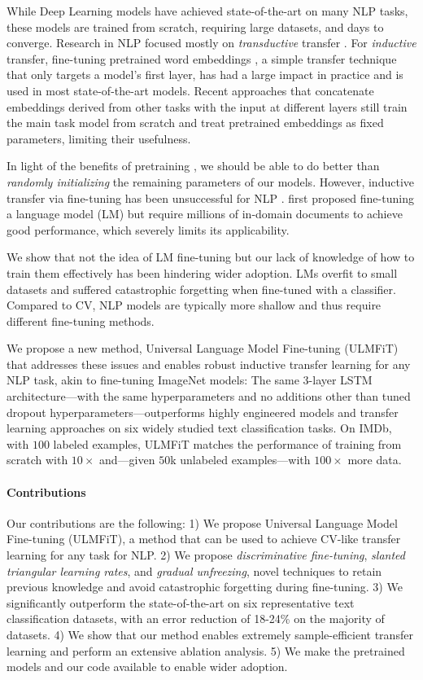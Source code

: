 \documentclass[11pt,a4paper]{article}
\begin{document}
While Deep Learning models have achieved state-of-the-art on many NLP tasks, these models are trained from scratch, requiring large datasets, and days to converge. Research in NLP focused mostly on \emph{transductive} transfer \cite{Blitzer2007}. For \emph{inductive} transfer, fine-tuning pretrained word embeddings \cite{Mikolov2013d}, a simple transfer technique that only targets a model's first layer, has had a large impact in practice and is used in most state-of-the-art models. Recent approaches that concatenate embeddings derived from other tasks with the input at different layers \cite{peters2017semi,Mccann2017,deepcontext2017} still train the main task model from scratch and treat pretrained embeddings as fixed parameters, limiting their usefulness. 

In light of the benefits of pretraining \cite{erhan2010does}, we should be able to do better than \emph{randomly initializing} the remaining parameters of our models. However, inductive transfer via fine-tuning has been unsuccessful for NLP \cite{Mou2016}.  first proposed fine-tuning a language model (LM) but require millions of in-domain documents to achieve good performance, which severely limits its applicability.

We show that not the idea of LM fine-tuning but our lack of knowledge of how to train them effectively has been hindering wider adoption. LMs overfit to small datasets and suffered catastrophic forgetting when fine-tuned with a classifier. Compared to CV, NLP models are typically more shallow and thus require different fine-tuning methods. 

We propose a new method, Universal Language Model Fine-tuning (ULMFiT) that addresses these issues and enables robust inductive transfer learning for any NLP task, akin to fine-tuning ImageNet models: The same 3-layer LSTM architecture---with the same hyperparameters and no additions other than tuned dropout hyperparameters---outperforms highly engineered models and transfer learning approaches on six widely studied text classification tasks. On IMDb, with $100$ labeled examples, ULMFiT matches the performance of training from scratch with $10\times$ and---given $50$k unlabeled examples---with $100\times$ more data.

\paragraph{Contributions} Our contributions are the following: 1) We propose Universal Language Model Fine-tuning (ULMFiT), a method that can be used to achieve CV-like transfer learning for any task for NLP. 2) We propose \emph{discriminative fine-tuning}, \emph{slanted triangular learning rates}, and \emph{gradual unfreezing}, novel techniques to retain previous knowledge and avoid catastrophic forgetting during fine-tuning. 3) We significantly outperform the state-of-the-art on six representative text classification datasets, with an error reduction of 18-24\% on the majority of datasets. 4) We show that our method enables extremely sample-efficient transfer learning and perform an extensive ablation analysis. 5) We make the pretrained models and our code available to enable wider adoption.
\end{document}
